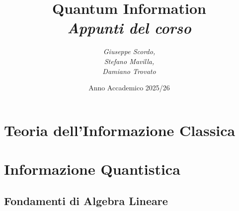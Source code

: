 \documentclass{report}
\title{\textbf{\Huge Quantum Information}\\ {\Large \textbf{\textit{Appunti del corso}}}}
\author{\textit{Giuseppe Scordo,} \\ \textit{Stefano Mavilla,} \\ \textit{Damiano Trovato}}
\date{Anno Accademico 2025/26}
\begin{document}
\maketitle
\tableofcontents


\part{Teoria dell'Informazione Classica}









\part{Informazione Quantistica}

\chapter{Fondamenti di Algebra Lineare}
\end{document}
